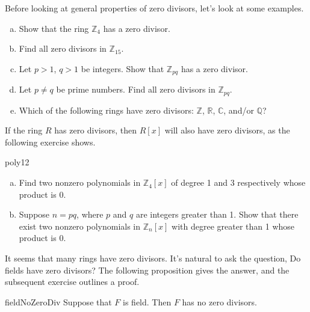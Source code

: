 Before looking at general properties of zero divisors, let's look at some examples.

\begin{exercise}{}
\begin{enumerate}[(a)]
\item
Show that the ring $\mathbb{Z}_4$ has a zero divisor.
\item
Find all zero divisors in $\mathbb{Z}_{15}$.
\item
Let $p>1$, $q>1$ be integers. Show that $\mathbb{Z}_{pq}$ has a zero divisor.
\item
Let $p\neq q$ be prime numbers. Find all zero divisors in $\mathbb{Z}_{pq}$.
\item
Which of the following rings have zero divisors: $\mathbb{Z}$, $\mathbb{R}$, $\mathbb{C}$, and/or $\mathbb{Q}$?
\end{enumerate}
\end{exercise}

\noindent
If the ring $R$ has zero divisors, then $R[x]$ will also have zero divisors, as the following exercise shows.

\begin{exercise}{poly12}
\begin{enumerate}[(a)]
\item
Find two nonzero polynomials in $\mathbb{Z}_4[x]$ of degree 1 and 3 respectively  whose product is 0.
\item
Suppose $n=pq$, where $p$ and $q$ are integers greater than 1. Show that there exist two nonzero polynomials in $\mathbb{Z}_n[x]$ with degree greater than 1 whose product is 0.
\end{enumerate}
\end{exercise}

It seems that many rings have zero divisors. It's natural to  ask the question, Do fields have zero divisors? The following proposition gives the answer, and the subsequent exercise outlines a proof.

\begin{prop}{fieldNoZeroDiv}
Suppose that $F$ is field. Then $F$ has no zero divisors.
\end{prop}


